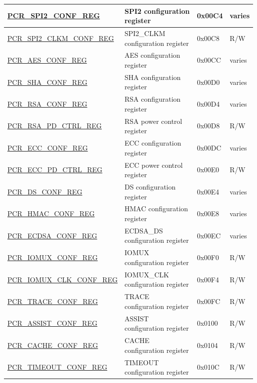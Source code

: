 \begin{longtable}{ | p{7cm} | p{6.2cm} | p{1.3cm} | p{1.5cm} | }
\hyperref[regdesc:PCRSPI2CONFREG]{PCR\_SPI2\_CONF\_REG} & SPI2 configuration register & 0x00C4 & varies \\ \hline
\hyperref[regdesc:PCRSPI2CLKMCONFREG]{PCR\_SPI2\_CLKM\_CONF\_REG} & SPI2\_CLKM configuration register & 0x00C8 & R/W \\ \hline
\hyperref[regdesc:PCRAESCONFREG]{PCR\_AES\_CONF\_REG} & AES configuration register & 0x00CC & varies \\ \hline
\hyperref[regdesc:PCRSHACONFREG]{PCR\_SHA\_CONF\_REG} & SHA configuration register & 0x00D0 & varies \\ \hline
\hyperref[regdesc:PCRRSACONFREG]{PCR\_RSA\_CONF\_REG} & RSA configuration register & 0x00D4 & varies \\ \hline
\hyperref[regdesc:PCRRSAPDCTRLREG]{PCR\_RSA\_PD\_CTRL\_REG} & RSA power control register & 0x00D8 & R/W \\ \hline
\hyperref[regdesc:PCRECCCONFREG]{PCR\_ECC\_CONF\_REG} & ECC configuration register & 0x00DC & varies \\ \hline
\hyperref[regdesc:PCRECCPDCTRLREG]{PCR\_ECC\_PD\_CTRL\_REG} & ECC power control register & 0x00E0 & R/W \\ \hline
\hyperref[regdesc:PCRDSCONFREG]{PCR\_DS\_CONF\_REG} & DS configuration register & 0x00E4 & varies \\ \hline
\hyperref[regdesc:PCRHMACCONFREG]{PCR\_HMAC\_CONF\_REG} & HMAC configuration register & 0x00E8 & varies \\ \hline
\hyperref[regdesc:PCRECDSACONFREG]{PCR\_ECDSA\_CONF\_REG} & ECDSA\_DS configuration register & 0x00EC & varies \\ \hline
\hyperref[regdesc:PCRIOMUXCONFREG]{PCR\_IOMUX\_CONF\_REG} & IOMUX configuration register & 0x00F0 & R/W \\ \hline
\hyperref[regdesc:PCRIOMUXCLKCONFREG]{PCR\_IOMUX\_CLK\_CONF\_REG} & IOMUX\_CLK configuration register & 0x00F4 & R/W \\ \hline
\hyperref[regdesc:PCRTRACECONFREG]{PCR\_TRACE\_CONF\_REG} & TRACE configuration register & 0x00FC & R/W \\ \hline
\hyperref[regdesc:PCRASSISTCONFREG]{PCR\_ASSIST\_CONF\_REG} & ASSIST configuration register & 0x0100 & R/W \\ \hline
\hyperref[regdesc:PCRCACHECONFREG]{PCR\_CACHE\_CONF\_REG} & CACHE configuration register & 0x0104 & R/W \\ \hline
\hyperref[regdesc:PCRTIMEOUTCONFREG]{PCR\_TIMEOUT\_CONF\_REG} & TIMEOUT configuration register & 0x010C & R/W \\ \hline

\end{longtable}
